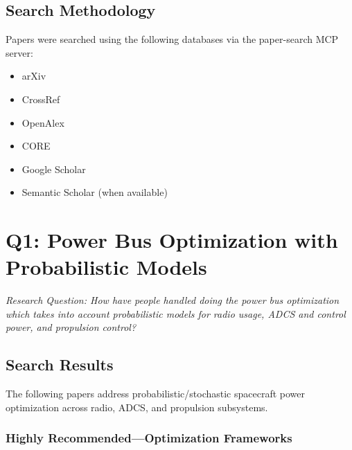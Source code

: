 \documentclass[11pt]{article}
\begin{document}
\subsection{Search Methodology}
Papers were searched using the following databases via the paper-search MCP server:
\begin{itemize}
    \item arXiv
    \item CrossRef
    \item OpenAlex
    \item CORE
    \item Google Scholar
    \item Semantic Scholar (when available)
\end{itemize}

\section{Q1: Power Bus Optimization with Probabilistic Models}
\label{sec:power}

\textit{Research Question: How have people handled doing the power bus optimization which takes into account probabilistic models for radio usage, ADCS and control power, and propulsion control?}

\subsection{Search Results}
The following papers address probabilistic/stochastic spacecraft power optimization across radio, ADCS, and propulsion subsystems.

\subsubsection{Highly Recommended---Optimization Frameworks}
\end{document}
